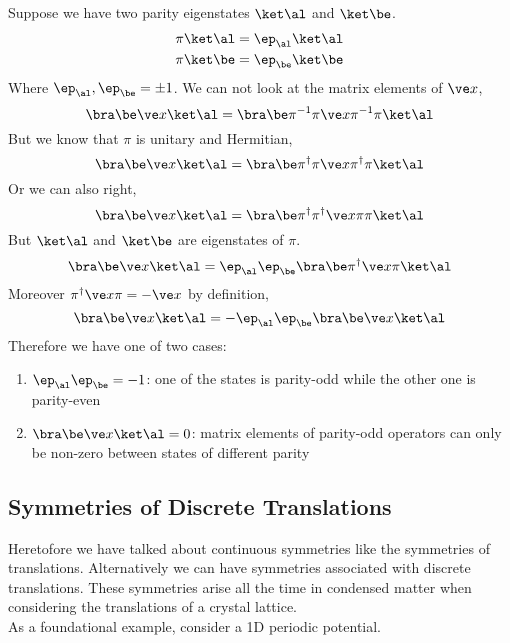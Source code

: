 \documentclass{article}
\begin{document}
Suppose we have two parity eigenstates $\ket \al$ and $\ket \be$.
\begin{align*}
    \pi \ket \al &= \ep_\al \ket \al \\
    \pi \ket \be &= \ep_\be \ket \be
\end{align*}
Where $\ep_\al, \ep_\be = \pm 1$. We can not look at the matrix elements of $\ve x$,
\[ \bra \be \ve x \ket \al = \bra \be \pi^{-1} \pi \ve x \pi^{-1} \pi \ket \al \]
But we know that $\pi$ is unitary and Hermitian,
\[ \bra \be \ve x \ket \al = \bra \be \pi^{\dagger} \pi \ve x \pi^{\dagger} \pi \ket \al \]
Or we can also right,
\[ \bra \be \ve x \ket \al = \bra \be \pi^{\dagger} \pi^{\dagger} \ve x \pi \pi \ket \al \]
But $\ket \al$ and $\ket \be$ are eigenstates of $\pi$.
\[ \bra \be \ve x \ket \al = \ep_\al \ep_\be \bra \be \pi^{\dagger} \ve x \pi \ket \al \]
Moreover $\pi^{\dagger} \ve x \pi = -\ve x$ by definition,
\[ \bra \be \ve x \ket \al = - \ep_\al \ep_\be \bra \be \ve x \ket \al \]
Therefore we have one of two cases:
\begin{enumerate}
    \item $\ep_\al \ep_\be = - 1$: one of the states is parity-odd while the other one is parity-even
    \item $\bra \be \ve x \ket \al = 0$: matrix elements of parity-odd operators can only be non-zero between states of different parity
\end{enumerate}

\subsection{Symmetries of Discrete Translations}

Heretofore we have talked about continuous symmetries like the symmetries of translations. Alternatively we can have symmetries associated with discrete translations. These symmetries arise all the time in condensed matter when considering the translations of a crystal lattice. \\

As a foundational example, consider a 1D periodic potential.

\begin{center}
\end{center}
\end{document}
